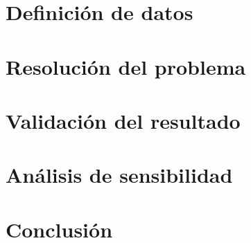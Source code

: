 \documentclass[letterpaper]{article}
\begin{document}
\begin{flushleft}
		\section{Definici\'on de datos}
		\section{Resoluci\'on del problema}
		\section{Validaci\'on del resultado}
		\section{An\'alisis de sensibilidad}
		\section{Conclusi\'on}

		
	\end{flushleft}
	
\end{document}
